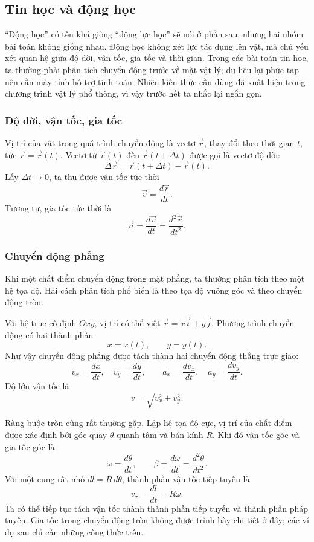 \documentclass[11pt]{article}
\begin{document}
\subsection{Tin học và động học}

``Động học'' có tên khá giống ``động lực học'' sẽ nói ở phần sau, nhưng hai
nhóm bài toán không giống nhau. Động học không xét lực tác dụng lên vật, mà chủ
yếu xét quan hệ giữa độ dời, vận tốc, gia tốc và thời gian. Trong các bài toán
tin học, ta thường phải phân tích chuyển động trước về mặt vật lý; dữ liệu lại
phức tạp nên cần máy tính hỗ trợ tính toán. Nhiều kiến thức cần dùng đã xuất
hiện trong chương trình vật lý phổ thông, vì vậy trước hết ta nhắc lại ngắn gọn.

\subsubsection{Độ dời, vận tốc, gia tốc}

Vị trí của vật trong quá trình chuyển động là vectơ \(\vec r\), thay đổi theo
thời gian \(t\), tức \(\vec r=\vec r(t)\). Vectơ từ \(\vec r(t)\) đến
\(\vec r(t+\Delta t)\) được gọi là vectơ độ dời:
\[
  \Delta \vec r=\vec r(t+\Delta t)-\vec r(t).
\]
Lấy \(\Delta t\to 0\), ta thu được vận tốc tức thời
\[
  \vec v=\frac{d\vec r}{dt}.
\]
Tương tự, gia tốc tức thời là
\[
  \vec a=\frac{d\vec v}{dt}=\frac{d^2\vec r}{dt^2}.
\]

\subsubsection{Chuyển động phẳng}

Khi một chất điểm chuyển động trong mặt phẳng, ta thường phân tích theo một hệ
tọa độ. Hai cách phân tích phổ biến là theo tọa độ vuông góc và theo chuyển
động tròn.

Với hệ trục cố định \(Oxy\), vị trí có thể viết
\(\vec r=x\vec i+y\vec j\). Phương trình chuyển động có hai thành phần
\[
  x=x(t),\qquad y=y(t).
\]
Như vậy chuyển động phẳng được tách thành hai chuyển động thẳng trực giao:
\[
  v_x=\frac{dx}{dt},\quad v_y=\frac{dy}{dt},\qquad
  a_x=\frac{dv_x}{dt},\quad a_y=\frac{dv_y}{dt}.
\]
Độ lớn vận tốc là
\[
  v=\sqrt{v_x^2+v_y^2}.
\]

Ràng buộc tròn cũng rất thường gặp. Lập hệ tọa độ cực, vị trí của chất điểm
được xác định bởi góc quay \(\theta\) quanh tâm và bán kính \(R\). Khi đó vận
tốc góc và gia tốc góc là
\[
  \omega=\frac{d\theta}{dt},\qquad
  \beta=\frac{d\omega}{dt}=\frac{d^2\theta}{dt^2}.
\]
Với một cung rất nhỏ \(dl=R\,d\theta\), thành phần vận tốc tiếp tuyến là
\[
  v_\tau=\frac{dl}{dt}=R\omega.
\]
Ta có thể tiếp tục tách vận tốc thành thành phần tiếp tuyến và thành phần pháp
tuyến. Gia tốc trong chuyển động tròn không được trình bày chi tiết ở đây; các
ví dụ sau chỉ cần những công thức trên.
\end{document}
